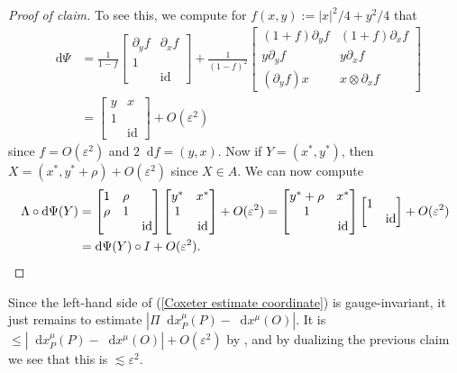 \documentclass[reqno,10pt]{amsart}
\DeclareMathOperator{\id}{id}
\newcommand*\dif{\mathop{}\!\mathrm{d}}
\theoremstyle{definition}
\numberwithin{equation}{section}
\begin{document}
\begin{proof}[Proof of claim]
To see this, we compute for $f(x, y) := |x|^2/4 + y^2/4$ that
\begin{align*}
\dif \Psi &= \frac{1}{1 - f} \begin{bmatrix} \partial_y f & \partial_x f \\ 1 \\ & \id \end{bmatrix} + \frac{1}{(1 - f)^2} \begin{bmatrix}(1 + f) \partial_y f & (1 + f) \partial_x f \\
y \partial_y f & y \partial_x f \\
(\partial_y f) x & x \otimes \partial_x f
\end{bmatrix} \\
&= \begin{bmatrix}y & x \\ 1 \\ & \id \end{bmatrix} + O(\varepsilon^2)
\end{align*}
since $f = O(\varepsilon^2)$ and $2\dif f = (y, x)$. Now if $Y = (x^*, y^*)$, then $X = (x^*, y^* + \rho) + O(\varepsilon^2)$ \cite[(4.5.5)]{ratcliffe2006foundations} since $X \in A$.
We can now compute 
\begin{align*}
\Lambda \circ \dif \Psi(Y) &= \begin{bmatrix}1 & \rho \\ \rho & 1 \\ && \id \end{bmatrix} \begin{bmatrix}y^* & x^* \\ 1 \\ & \id \end{bmatrix} + O(\varepsilon^2) = \begin{bmatrix}y^* + \rho & x^* \\ 1 \\ & \id\end{bmatrix} \begin{bmatrix}1 \\ & \id\end{bmatrix} + O(\varepsilon^2) \\
&= \dif \Psi(Y) \circ I + O(\varepsilon^2). \qedhere
\end{align*}
\end{proof}

Since the left-hand side of (\ref{Coxeter estimate coordinate}) is gauge-invariant, it just remains to estimate $|\Pi \dif x^\mu_P(P) - \dif x^\mu(O)|$.
It is $\leq |\dif x^\mu_P(P) - \dif x^\mu(O)| + O(\varepsilon^2)$ by \cite[Lemma 4.2]{daskalopoulosPrep1}, and by dualizing the previous claim we see that this is $\lesssim \varepsilon^2$.

\printbibliography
\end{document}
